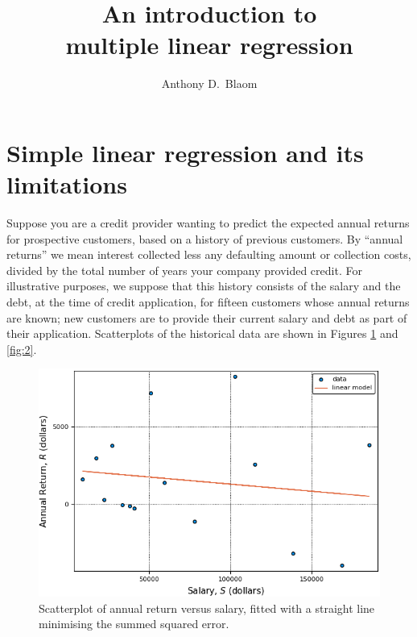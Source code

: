 \documentclass[11pt, reqno]{amsart} \usepackage{hyperlatex}
\begin{document}
 \title[Multiple regression]{An
  introduction to \\ multiple linear regression} \author{Anthony
  D.~Blaom}
\maketitle
\tableofcontents

\section*{Simple linear regression and its limitations}
Suppose you are a credit provider wanting to predict the expected
annual returns for prospective customers, based on a history of
previous customers. By ``annual returns'' we mean interest collected
less any defaulting amount or collection costs, divided by the total
number of years your company provided credit. For illustrative purposes, we
suppose that this history consists of the salary and the debt, at the
time of credit application, for fifteen customers whose annual returns
are known; new customers are to provide their current salary and debt
as part of their application. Scatterplots of the historical data are
shown in Figures \ref{fig:1} and \ref{fig:2}.

\begin{figure}[h]
  \includegraphics[scale=0.6]{model1.png}
  \caption{Scatterplot of annual return versus salary,
    fitted with a straight line minimising the summed squared error.}
  \label{fig:1}
\end{figure}
\end{document}
